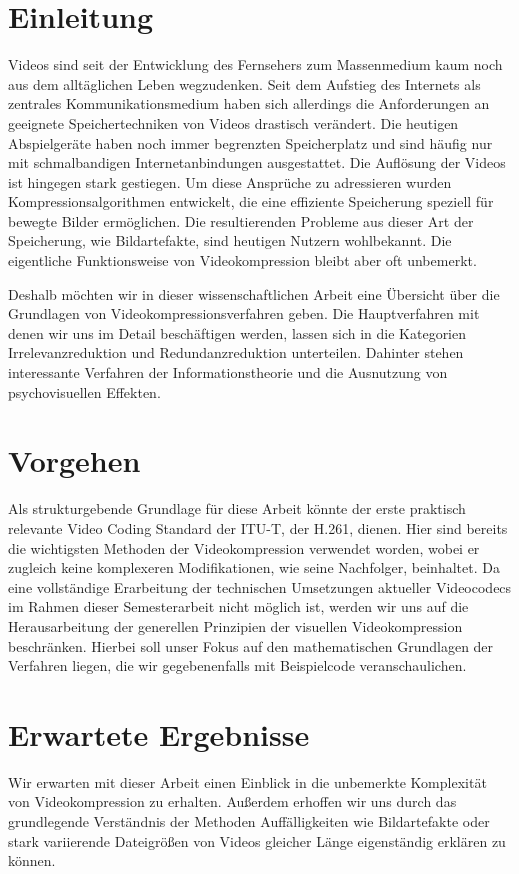 \section{Einleitung}


Videos sind seit der Entwicklung des Fernsehers zum Massenmedium kaum noch aus dem alltäglichen Leben wegzudenken. Seit dem Aufstieg des Internets als zentrales Kommunikationsmedium haben sich allerdings die Anforderungen an geeignete Speichertechniken von Videos drastisch verändert. Die heutigen Abspielgeräte haben noch immer begrenzten Speicherplatz und sind häufig nur mit schmalbandigen Internetanbindungen ausgestattet. Die Auflösung der Videos ist hingegen stark gestiegen. Um diese Ansprüche zu adressieren wurden Kompressionsalgorithmen entwickelt, die eine effiziente Speicherung speziell für bewegte Bilder ermöglichen. Die resultierenden Probleme aus dieser Art der Speicherung, wie Bildartefakte, sind heutigen Nutzern wohlbekannt. Die eigentliche Funktionsweise von Videokompression bleibt aber oft unbemerkt.

Deshalb möchten wir in dieser wissenschaftlichen Arbeit eine Übersicht über die Grundlagen von Videokompressionsverfahren geben. Die Hauptverfahren mit denen wir uns im Detail beschäftigen werden, lassen sich in die Kategorien Irrelevanzreduktion und Redundanzreduktion unterteilen. Dahinter stehen interessante Verfahren der Informationstheorie und die Ausnutzung von psychovisuellen Effekten. %

\section{Vorgehen}

Als strukturgebende Grundlage für diese Arbeit könnte der erste praktisch relevante Video Coding Standard der ITU-T, der H.261, dienen. Hier sind bereits die wichtigsten Methoden der Videokompression verwendet worden, wobei er zugleich keine komplexeren Modifikationen, wie seine Nachfolger, beinhaltet. Da eine vollständige Erarbeitung der technischen Umsetzungen aktueller Videocodecs im Rahmen dieser Semesterarbeit nicht möglich ist, werden wir uns auf die Herausarbeitung der generellen Prinzipien der visuellen Videokompression beschränken. Hierbei soll unser Fokus auf den mathematischen Grundlagen der Verfahren liegen, die wir gegebenenfalls mit Beispielcode veranschaulichen.

\section{Erwartete Ergebnisse}

Wir erwarten mit dieser Arbeit einen Einblick in die unbemerkte Komplexität von Videokompression zu erhalten. Außerdem erhoffen wir uns durch das grundlegende Verständnis der Methoden Auffälligkeiten wie Bildartefakte oder stark variierende Dateigrößen von Videos gleicher Länge eigenständig erklären zu können.